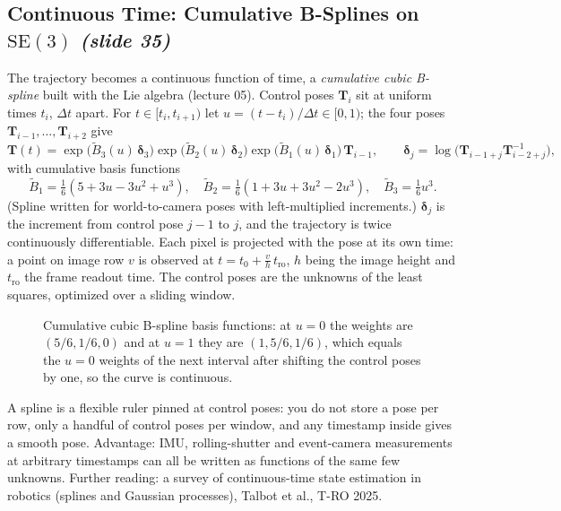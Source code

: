 \documentclass[11pt,a4paper]{article}
\newcommand{\slrs}[1]{\texorpdfstring{\emph{(slide #1)}}{(slide #1)}}
\newcommand{\bT}{\mathbf{T}}
\newcommand{\SE}{\mathrm{SE}(3)}
\theoremstyle{definition}
\theoremstyle{plain}
\theoremstyle{remark}
\begin{document}
\subsection{Continuous Time: Cumulative B-Splines on $\SE$ \slrs{35}}
The trajectory becomes a continuous function of time, a \emph{cumulative cubic B-spline} built with the Lie algebra (lecture 05). Control poses $\bT_i$ sit at uniform times $t_i$, $\Delta t$ apart. For $t\in[t_i,t_{i+1})$ let $u=(t-t_i)/\Delta t\in[0,1)$; the four poses $\bT_{i-1},\dots,\bT_{i+2}$ give
\[
\bT(t)=\exp\!\big(\tilde B_3(u)\,\boldsymbol\delta_3\big)\exp\!\big(\tilde B_2(u)\,\boldsymbol\delta_2\big)\exp\!\big(\tilde B_1(u)\,\boldsymbol\delta_1\big)\,\bT_{i-1},\qquad
\boldsymbol\delta_j=\log\!\big(\bT_{i-1+j}\bT_{i-2+j}^{-1}\big),
\]
with cumulative basis functions
\[
\tilde B_1=\tfrac16(5+3u-3u^2+u^3),\quad \tilde B_2=\tfrac16(1+3u+3u^2-2u^3),\quad \tilde B_3=\tfrac16u^3 .
\]
(Spline written for world-to-camera poses with left-multiplied increments.) $\boldsymbol\delta_j$ is the increment from control pose $j-1$ to $j$, and the trajectory is twice continuously differentiable. Each pixel is projected with the pose at its own time: a point on image row $v$ is observed at $t=t_0+\frac{v}{h}\,t_{\text{ro}}$, $h$ being the image height and $t_{\text{ro}}$ the frame readout time. The control poses are the unknowns of the least squares, optimized over a sliding window.
\begin{figure}[htbp]\centering
{}
\caption{Cumulative cubic B-spline basis functions: at $u=0$ the weights are $(5/6,1/6,0)$ and at $u=1$ they are $(1,5/6,1/6)$, which equals the $u=0$ weights of the next interval after shifting the control poses by one, so the curve is continuous.}
\end{figure}
\begin{intuition}
A spline is a flexible ruler pinned at control poses: you do not store a pose per row, only a handful of control poses per window, and any timestamp inside gives a smooth pose. Advantage: IMU, rolling-shutter and event-camera measurements at arbitrary timestamps can all be written as functions of the same few unknowns. Further reading: a survey of continuous-time state estimation in robotics (splines and Gaussian processes), Talbot et al., T-RO 2025.
\end{intuition}
\end{document}
